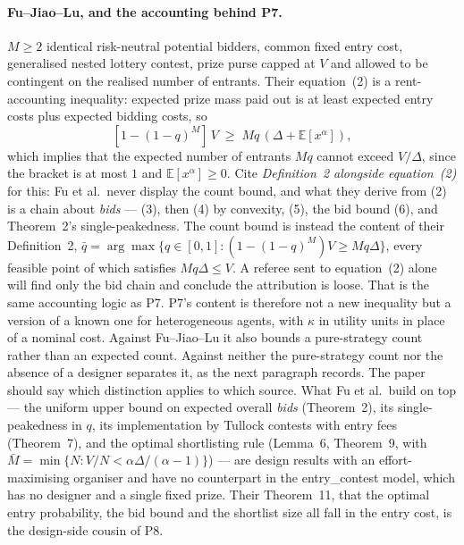 \documentclass[11pt,a4paper]{article}
\begin{document}
\paragraph{Fu--Jiao--Lu, and the accounting behind P7.} $M \geq 2$ identical
risk-neutral potential bidders, common fixed entry cost, generalised nested
lottery contest, prize purse capped at $V$ and allowed to be contingent on the
realised number of entrants. Their equation~(2) is a rent-accounting
inequality: expected prize mass paid out is at least expected entry costs plus
expected bidding costs, so
\[
  [1-(1-q)^M]\,V \;\geq\; Mq\,(\Delta + \mathbb{E}[x^\alpha]),
\]
which implies that the expected number of entrants $Mq$ cannot exceed
$V/\Delta$, since the bracket is at most $1$ and $\mathbb{E}[x^\alpha] \geq 0$.
Cite \emph{Definition~2 alongside equation~(2)} for this: Fu et al.\ never
display the count bound, and what they derive from (2) is a chain about
\emph{bids} --- (3), then (4) by convexity, (5), the bid bound (6), and
Theorem~2's single-peakedness. The count bound is instead the content of their
Definition~2, $\bar q = \arg\max\{q \in [0,1] : (1-(1-q)^M)V \geq Mq\Delta\}$,
every feasible point of which satisfies $Mq\Delta \leq V$. A referee sent to
equation~(2) alone will find only the bid chain and conclude the attribution is
loose.
That is the same accounting logic as P7. P7's content is therefore not a new
inequality but a version of a known one for heterogeneous agents, with $\kappa$
in utility units in place of a nominal cost. Against Fu--Jiao--Lu it also
bounds a pure-strategy count rather than an expected count. Against
\citet{FuLu2010} neither the pure-strategy count nor the absence of a designer
separates it, as the next paragraph records. The paper should say which
distinction applies to which source. What Fu et
al.\ build on top --- the uniform upper bound on expected overall \emph{bids}
(Theorem~2), its single-peakedness in $q$, its implementation by Tullock
contests with entry fees (Theorem~7), and the optimal shortlisting rule
(Lemma~6, Theorem~9, with $\bar M = \min\{N : V/N < \alpha\Delta/(\alpha-1)\}$)
--- are design results with an effort-maximising organiser and have no
counterpart in the entry\_contest model, which has no designer and a single
fixed prize. Their Theorem~11, that the optimal entry probability, the bid
bound and the shortlist size all fall in the entry cost, is the design-side
cousin of P8.
\end{document}

